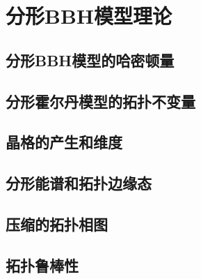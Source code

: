 \chapter{分形BBH模型理论}
\section{分形BBH模型的哈密顿量}
\section{分形霍尔丹模型的拓扑不变量}
\section{晶格的产生和维度}
\section{分形能谱和拓扑边缘态}
\section{压缩的拓扑相图}
\section{拓扑鲁棒性}
